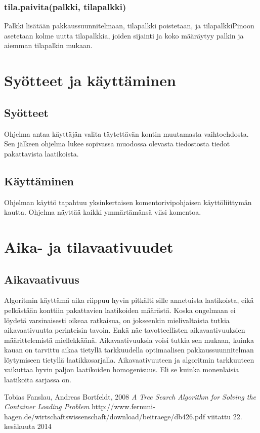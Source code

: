 \documentclass[a4paper,12pt, titlepage]{article}
\begin{document}
\subsubsection*{tila.paivita(palkki, tilapalkki)}
Palkki lisätään pakkaussuunnitelmaan, tilapalkki poistetaan, ja tilapalkkiPinoon asetetaan kolme uutta tilapalkkia, joiden sijainti ja koko määräytyy palkin ja aiemman tilapalkin mukaan.

\section*{Syötteet ja käyttäminen}
\subsection*{Syötteet}
Ohjelma antaa käyttäjän valita täytettävän kontin muutamasta vaihtoehdosta. Sen jälkeen ohjelma lukee sopivassa muodossa olevasta tiedostosta tiedot pakattavista laatikoista.

\subsection*{Käyttäminen}
Ohjelman käyttö tapahtuu yksinkertaisen komentorivipohjaisen käyttöliittymän kautta. Ohjelma näyttää kaikki ymmärtämänsä viisi komentoa.

\section*{Aika- ja tilavaativuudet}
\subsection*{Aikavaativuus}
Algoritmin käyttämä aika riippuu hyvin pitkälti sille annetuista laatikoista, eikä pelkästään konttiin pakattavien laatikoiden määrästä. Koska ongelmaan ei löydetä varsinaisesti oikeaa ratkaisua, on jokseenkin mielivaltaista tutkia aikavaativuutta perinteisin tavoin. Enkä näe tavotteellisten aikavaativuuksien määrittelemistä miellekkäänä. Aikavaativuuksia voisi tutkia sen mukaan, kuinka kauan on tarvittu aikaa tietyllä tarkkuudella optimaalisen pakkaussuunnitelman löytymiseen tietyllä laatikkosarjalla. Aikavaativuuteen ja algoritmin tarkkuuteen vaikuttaa hyvin paljon laatikoiden homogenisuus. Eli se kuinka monenlaisia laatikoita sarjassa on.  

\begin{thebibliography}{9}

  Tobias Fanslau, Andreas Bortfeldt, 2008 \newline
  \emph{A Tree Search Algorithm for Solving the Container Loading Problem }\newline
  http://www.fernuni-hagen.de/wirtschaftswissenschaft/download/beitraege/db426.pdf\newline
  viitattu 22. kesäkuuta 2014

\end{thebibliography}
\end{document}
